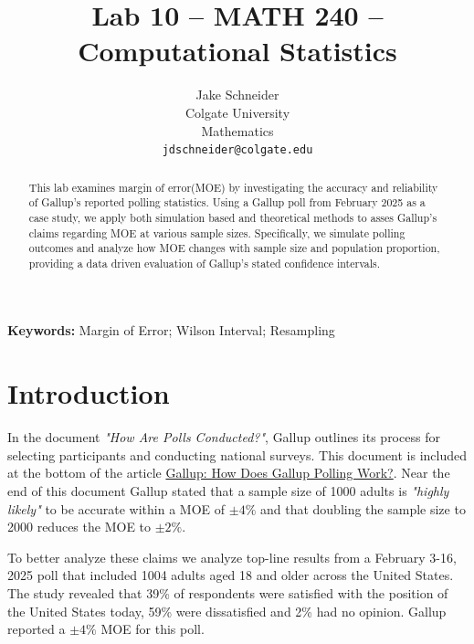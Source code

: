 \documentclass{article}\usepackage[]{graphicx}\usepackage[]{xcolor}
\begin{document}
\vspace{-1in}
\title{Lab 10 -- MATH 240 -- Computational Statistics}

\author{
  Jake Schneider \\
  Colgate University  \\
  Mathematics  \\
  {\tt jdschneider@colgate.edu}
}

\date{}

\maketitle

\begin{multicols}{2}
\begin{abstract}
This lab examines margin of error(MOE) by investigating the accuracy and reliability of Gallup's reported polling statistics. Using a Gallup poll from February 2025 as a case study, we apply both simulation based and theoretical methods to asses Gallup's claims regarding MOE at various sample sizes. Specifically, we simulate polling outcomes and analyze how MOE changes with sample size and population proportion, providing a data driven evaluation of Gallup's stated confidence intervals. 
\end{abstract}

\noindent \textbf{Keywords:} Margin of Error; Wilson Interval; Resampling

\section{Introduction}
In the document \textit{"How Are Polls Conducted?"}, Gallup outlines its process for selecting participants and conducting national surveys. This document is included at the bottom of the article \href{https://news.gallup.com/poll/101872/how-does-gallup-polling-work.aspx}{Gallup: How Does Gallup Polling Work?}. Near the end of this document Gallup stated that a sample size of 1000 adults is \textit{"highly likely"} to be accurate within a MOE of $\pm 4\%$ and that doubling the sample size to 2000 reduces the MOE to $\pm 2\%$.

To better analyze these claims we analyze top-line results from a February 3-16, 2025 poll that included 1004 adults aged 18 and older across the United States. The study revealed that 39\% of respondents were satisfied with the position of the United States today, 59\% were dissatisfied and 2\% had no opinion. Gallup reported a $\pm 4\%$ MOE for this poll. 


\end{multicols}
\end{document}
